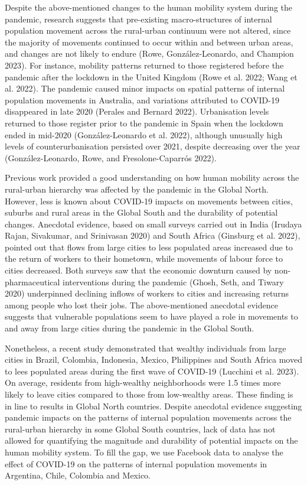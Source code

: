 \documentclass[
  10pt,
  letterpaper,
  DIV=11,
  numbers=noendperiod]{scrartcl}
\begin{document}
Despite the above-mentioned changes to the human mobility system during
the pandemic, research suggests that pre-existing macro-structures of
internal population movement across the rural-urban continuum were not
altered, since the majority of movements continued to occur within and
between urban areas, and changes are not likely to endure (Rowe,
González-Leonardo, and Champion 2023). For instance, mobility patterns
returned to those registered before the pandemic after the lockdown in
the United Kingdom (Rowe et al. 2022; Wang et al. 2022). The pandemic
caused minor impacts on spatial patterns of internal population
movements in Australia, and variations attributed to COVID-19
disappeared in late 2020 (Perales and Bernard 2022). Urbanisation levels
returned to those register prior to the pandemic in Spain when the
lockdown ended in mid-2020 (González-Leonardo et al. 2022), although
unusually high levels of counterurbanisation persisted over 2021,
despite decreasing over the year (González-Leonardo, Rowe, and
Fresolone-Caparrós 2022).

Previous work provided a good understanding on how human mobility across
the rural-urban hierarchy was affected by the pandemic in the Global
North. However, less is known about COVID-19 impacts on movements
between cities, suburbs and rural areas in the Global South and the
durability of potential changes. Anecdotal evidence, based on small
surveys carried out in India (Irudaya Rajan, Sivakumar, and Srinivasan
2020) and South Africa (Ginsburg et al. 2022), pointed out that flows
from large cities to less populated areas increased due to the return of
workers to their hometown, while movements of labour force to cities
decreased. Both surveys saw that the economic downturn caused by
non-pharmaceutical interventions during the pandemic (Ghosh, Seth, and
Tiwary 2020) underpinned declining inflows of workers to cities and
increasing returns among people who lost their jobs. The above-mentioned
anecdotal evidence suggests that vulnerable populations seem to have
played a role in movements to and away from large cities during the
pandemic in the Global South.

Nonetheless, a recent study demonstrated that wealthy individuals from
large cities in Brazil, Colombia, Indonesia, Mexico, Philippines and
South Africa moved to lees populated areas during the first wave of
COVID-19 (Lucchini et al. 2023). On average, residents from high-wealthy
neighborhoods were 1.5 times more likely to leave cities compared to
those from low-wealthy areas. These finding is in line to results in
Global North countries. Despite anecdotal evidence suggesting pandemic
impacts on the patterns of internal population movements across the
rural-urban hierarchy in some Global South countries, lack of data has
not allowed for quantifying the magnitude and durability of potential
impacts on the human mobility system. To fill the gap, we use Facebook
data to analyse the effect of COVID-19 on the patterns of internal
population movements in Argentina, Chile, Colombia and Mexico.
\end{document}
